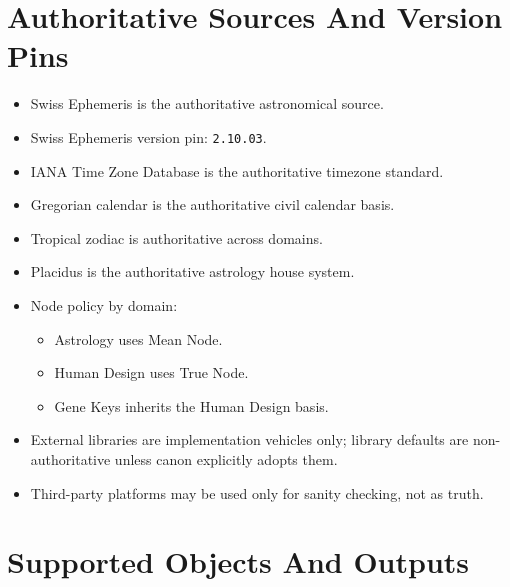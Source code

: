 \documentclass[11pt]{article}
\begin{document}
\section{Authoritative Sources And Version Pins}
\label{sec:orgb97f8b4}
\begin{itemize}
\item Swiss Ephemeris is the authoritative astronomical source.
\item Swiss Ephemeris version pin: \texttt{2.10.03}.
\item IANA Time Zone Database is the authoritative timezone standard.
\item Gregorian calendar is the authoritative civil calendar basis.
\item Tropical zodiac is authoritative across domains.
\item Placidus is the authoritative astrology house system.
\item Node policy by domain:
\begin{itemize}
\item Astrology uses Mean Node.
\item Human Design uses True Node.
\item Gene Keys inherits the Human Design basis.
\end{itemize}
\item External libraries are implementation vehicles only; library defaults are non-authoritative unless canon explicitly adopts them.
\item Third-party platforms may be used only for sanity checking, not as truth.
\end{itemize}
\section{Supported Objects And Outputs}
\label{sec:org4cafe82}
\end{document}
